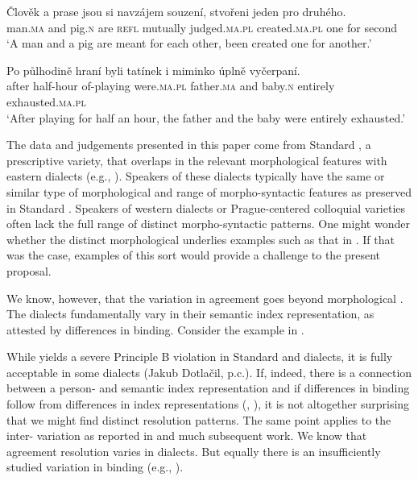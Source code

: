 \documentclass[output=paper,modfontsnewtxmath,hidelinks]{langscibook}
\begin{document}
\ea\gll Člověk a prase jsou si navzájem souzení, stvořeni jeden pro druhého.\label{colloq}\\
man.\textsc{ma} and pig.\textsc{n} are \textsc{refl} mutually judged.\textsc{ma.pl} created.\textsc{ma.pl} one for second\\
\glt `A man and a pig are meant for each other, been created one for another.'
\z

\ea\gll Po půlhodině hraní byli tatínek i miminko úplně vyčerpaní.\label{human}\\
after half-hour of-playing were.\textsc{ma.pl} father.\textsc{ma} and baby.\textsc{n} entirely exhausted.\textsc{ma.pl}\\
\glt `After playing for half an hour, the father and the baby were entirely exhausted.'
\z

\noindent The data and judgements presented in this paper come from Standard , a prescriptive variety, that  overlaps in the relevant morphological features with eastern  dialects (e.g., \citealt[401--404]{KarlikEtAl:2002}). Speakers of these dialects typically have the same or similar type of morphological  and range of morpho-syntactic features as preserved in Standard . Speakers of western dialects or Prague-centered colloquial varieties often lack the full range of distinct morpho-syntactic patterns. One might wonder whether the distinct morphological  underlies examples such as that in . If that was the case, examples of this sort would provide a challenge to the present proposal.

We know, however, that the variation in agreement goes beyond morphological . The dialects fundamentally vary in their semantic index representation, as attested by differences in binding. Consider the example in .

\z

\noindent While  yields a severe Principle B violation in Standard  and  dialects, it is fully acceptable in some  dialects (Jakub Dotlačil, p.c.). If, indeed, there is a connection between a person- and semantic index representation and if differences in binding follow from differences in index representations (\citealt{Heim1998}, \citealt{Roelofsen2008}), it is not altogether surprising that we might find distinct resolution patterns. The same point applies to the inter- variation as reported in \citet{corbett83} and much subsequent work. We know that agreement resolution varies in  dialects. But equally there is an insufficiently studied variation in binding (e.g., \citealt{Nikolaeva2014}). 
\end{document}
